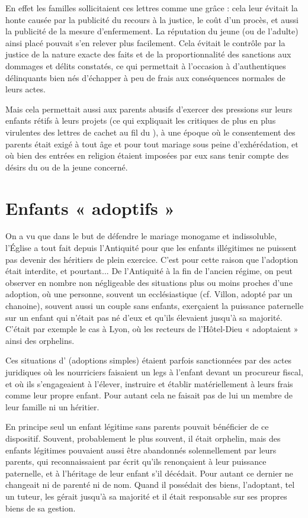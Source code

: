  En effet les familles sollicitaient ces lettres comme une grâce : cela leur évitait la honte causée par la publicité du recours à la justice, le coût d'un procès, et aussi la publicité de la mesure d'enfermement. La réputation du jeune (ou de l'adulte) ainsi placé pouvait s'en relever plus facilement. Cela évitait le contrôle par la justice de la nature exacte des faits et de la proportionnalité des sanctions aux dommages et délits constatés, ce qui permettait à l'occasion à d'authentiques délinquants bien nés d'échapper à peu de frais aux conséquences normales de leurs actes. 

Mais cela permettait aussi aux parents abusifs d'exercer des pressions sur leurs enfants rétifs à leurs projets (ce qui expliquait les critiques de plus en plus virulentes des lettres de cachet au fil du ), à une époque où le consentement des parents était exigé à tout âge et pour tout mariage sous peine d'exhérédation, et où bien des entrées en religion étaient imposées par eux sans tenir compte des désirs du ou de la jeune concerné. 

\section{Enfants « adoptifs »}

 On a vu que dans le but de défendre le mariage monogame et indissoluble, l'Église a tout fait depuis l'Antiquité pour que les enfants illégitimes ne puissent pas devenir des héritiers de plein exercice. C'est pour cette raison que l'adoption était interdite, et pourtant... De l'Antiquité à la fin de l'ancien régime, on peut observer en nombre non négligeable des situations plus ou moins proches d'une adoption, où une personne, souvent un ecclésiastique (cf. \hbox{Villon}, adopté par un chanoine), souvent aussi un couple sans enfants, exerçaient la puissance paternelle sur un enfant qui n'était pas né d'eux et qu'ils élevaient jusqu'à sa majorité. C'était par exemple le cas à Lyon, où les recteurs de l'Hôtel-Dieu « adoptaient » ainsi des orphelins. 

 Ces situations d' (adoptions simples) étaient parfois sanctionnées par des actes juridiques où les nourriciers faisaient un legs à l'enfant devant un procureur fiscal, et où ils s'engageaient à l'élever, instruire et établir matériellement à leurs frais comme leur propre enfant. Pour autant cela ne faisait pas de lui un membre de leur famille ni un héritier. 

 En principe seul un enfant légitime sans parents pouvait bénéficier de ce dispositif. Souvent, probablement le plus souvent, il était orphelin, mais des enfants légitimes pouvaient aussi être abandonnés solennellement par leurs parents, qui reconnaissaient par écrit qu'ils renonçaient à leur puissance paternelle, et à l'héritage de leur enfant s'il décédait. Pour autant ce dernier ne changeait ni de parenté ni de nom. Quand il possédait des biens, l'adoptant, tel un tuteur, les gérait jusqu'à sa majorité et il était responsable sur ses propres biens de sa gestion. 

